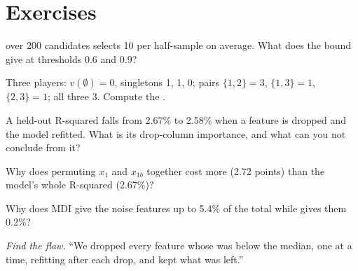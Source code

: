 \section{Exercises}

\begin{exercise}[$\star$]\label{exo:ml:feature-engineering-selection-and-importance:1}
 over 200 candidates selects 10 per half-sample on average. What does the bound give at thresholds
0.6 and 0.9?
\end{exercise}

\begin{exercise}[$\star$]\label{exo:ml:feature-engineering-selection-and-importance:2}
Three players: $v(\emptyset) = 0$, singletons 1, 1, 0; pairs $\{1,2\} = 3$, $\{1,3\} = 1$, $\{2,3\} = 1$; all three 3.
Compute the .
\end{exercise}

\begin{exercise}[$\star$]\label{exo:ml:feature-engineering-selection-and-importance:3}
A held-out R-squared falls from 2.67\% to 2.58\% when a feature is dropped and the model refitted. What is its drop-column
importance, and what can you not conclude from it?
\end{exercise}

\begin{exercise}[$\star\star$]\label{exo:ml:feature-engineering-selection-and-importance:4}
Why does permuting $x_1$ and $x_{1b}$ together cost more (2.72 points) than the model's whole R-squared (2.67\%)?
\end{exercise}

\begin{exercise}[$\star\star$]\label{exo:ml:feature-engineering-selection-and-importance:5}
Why does MDI give the noise features up to 5.4\% of the total while  gives them 0.2\%?
\end{exercise}

\begin{exercise}[$\star\star$]\label{exo:ml:feature-engineering-selection-and-importance:6}
\emph{Find the flaw.} ``We dropped every feature whose  was below the median, one at a time,
refitting after each drop, and kept what was left.''
\end{exercise}


